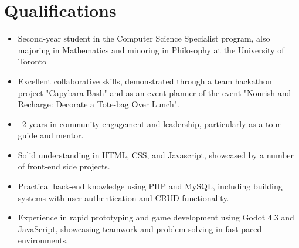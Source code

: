 \documentclass[a4paper,10pt]{article} %
\makeatletter
\newenvironment{joblong}[2]
    {
    \begin{tabularx}{\linewidth}{@{}l X r@{}}
    \textbf{#1} & \hfill &  #2 \\[3.75pt]
    \end{tabularx}
    \begin{minipage}[t]{\linewidth}
    \begin{itemize}[nosep,after=\strut, leftmargin=1em, itemsep=3pt,label=--]
    }
    {
    \end{itemize}
    \end{minipage}    
    }
\makeatother
\begin{document}

\section{Qualifications}
\begin{itemize}
    \item Second-year student in the Computer Science Specialist program, also majoring in Mathematics and minoring in Philosophy at the University of Toronto
    \item Excellent collaborative skills, demonstrated through a team hackathon project "Capybara Bash" and as an event planner of the event "Nourish and Recharge: Decorate a Tote-bag Over Lunch".
    \item ~2 years in community engagement and leadership, particularly as a tour guide and mentor.
    \item Solid understanding in HTML, CSS, and Javascript, showcased by a number of front-end side projects.
    \item Practical back-end knowledge using PHP and MySQL, including building systems with user authentication and CRUD functionality.
    \item Experience in rapid prototyping and game development using Godot 4.3 and JavaScript, showcasing teamwork and problem-solving in fast-paced environments.
\end{itemize}

\end{document}
